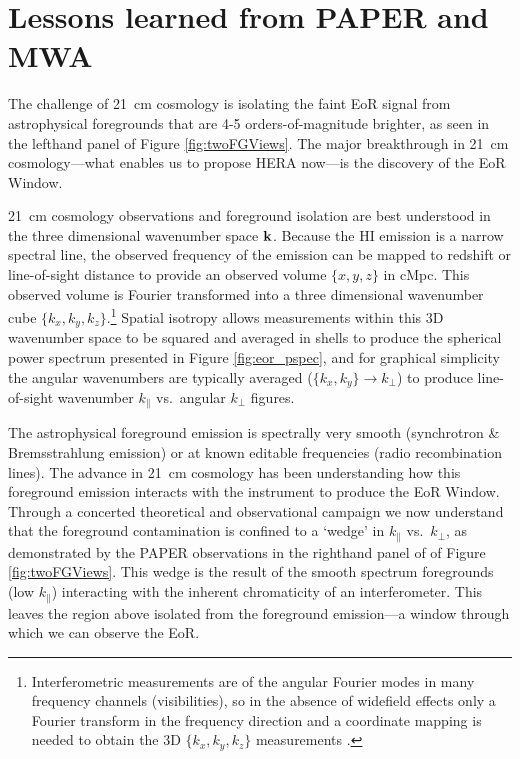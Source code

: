 \documentclass[preprint]{aastex}
\def\kperp{k_{\bot}}
\def\kpar{k_{\|}}
\def\k{{\bf k}}
\def\HI{{H{\small I }}}
\begin{document}

\vspace{-0.25in}
\section{Lessons learned from PAPER and MWA}
\label{LessonsSec}

The challenge of 21~cm cosmology is isolating the faint EoR signal from astrophysical foregrounds that are 4-5 orders-of-magnitude brighter, as seen in the lefthand panel of Figure \ref{fig:twoFGViews}. The major breakthrough in 21~cm cosmology---what enables us to propose HERA now---is the discovery of the EoR Window.

21~cm cosmology observations and foreground isolation are best understood in the three dimensional wavenumber space $\k$.
Because the \HI emission is a narrow spectral line, the observed frequency of the emission can be mapped to redshift or line-of-sight distance to provide an observed volume $\{x,y,z\}$ in cMpc. This observed volume is Fourier transformed into a three dimensional wavenumber cube $\{k_{x}, k_{y}, k_{z}\}$.\footnote{Interferometric measurements are of the angular Fourier modes in many frequency channels (visibilities), so in the absence of widefield effects only a Fourier transform in the frequency direction and a coordinate mapping is needed to obtain the 3D $\{k_{x}, k_{y}, k_{z}\}$ measurements \citep{morales_hewitt2004}.}
Spatial isotropy allows measurements within this 3D wavenumber space to be squared and averaged in shells to produce the spherical power spectrum presented in Figure \ref{fig:eor_pspec}, and for graphical simplicity the angular wavenumbers are typically averaged ($\{k_{x},k_{y}\}\rightarrow\kperp$) to produce line-of-sight wavenumber $\kpar$ vs.\ angular $\kperp$ figures.

The astrophysical foreground emission is spectrally very smooth (synchrotron \& Bremsstrahlung emission) or at known editable frequencies (radio recombination lines). The advance in 21~cm cosmology has been understanding how this foreground emission interacts with the instrument to produce the EoR Window. Through a concerted theoretical and observational campaign \citep{morales_et_al2012,parsons_et_al2012b,vedantham_2012,hazelton_et_al2013,pober_et_al2013,parsons_et_al2013,dillon_et_al2013b} we now understand that the foreground contamination is confined to a `wedge' in $\kpar$ vs.\ $\kperp$, as demonstrated by the PAPER observations in the righthand panel of of Figure \ref{fig:twoFGViews}. This wedge is the result of the smooth spectrum foregrounds (low $\kpar$) interacting with the inherent chromaticity of an interferometer. This leaves the region above isolated from the foreground emission---a window through which we can observe the EoR.
\end{document}
